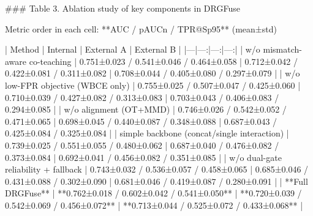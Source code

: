 ### Table 3. Ablation study of key components in DRGFuse

Metric order in each cell: **AUC / pAUCn / TPR@Sp95** (mean±std)

| Method | Internal | External A | External B |
|---|---:|---:|---:|
| w/o mismatch-aware co-teaching | 0.751±0.023 / 0.541±0.046 / 0.464±0.058 | 0.712±0.042 / 0.422±0.081 / 0.311±0.082 | 0.708±0.044 / 0.405±0.080 / 0.297±0.079 |
| w/o low-FPR objective (WBCE only) | 0.755±0.025 / 0.507±0.047 / 0.425±0.060 | 0.710±0.039 / 0.427±0.082 / 0.313±0.083 | 0.703±0.043 / 0.406±0.083 / 0.294±0.085 |
| w/o alignment (OT+MMD) | 0.746±0.026 / 0.542±0.052 / 0.471±0.065 | 0.698±0.045 / 0.440±0.087 / 0.348±0.088 | 0.687±0.043 / 0.425±0.084 / 0.325±0.084 |
| simple backbone (concat/single interaction) | 0.739±0.025 / 0.551±0.055 / 0.480±0.062 | 0.687±0.040 / 0.476±0.082 / 0.373±0.084 | 0.692±0.041 / 0.456±0.082 / 0.351±0.085 |
| w/o dual-gate reliability + fallback | 0.743±0.032 / 0.536±0.057 / 0.458±0.065 | 0.685±0.046 / 0.431±0.088 / 0.302±0.090 | 0.681±0.046 / 0.419±0.087 / 0.280±0.091 |
| **Full DRGFuse** | **0.762±0.018 / 0.602±0.042 / 0.541±0.050** | **0.720±0.039 / 0.542±0.069 / 0.456±0.072** | **0.713±0.044 / 0.525±0.072 / 0.433±0.068** |
